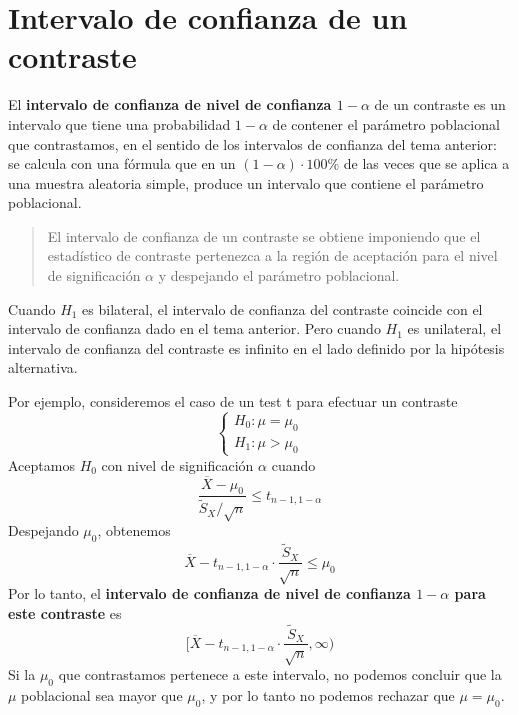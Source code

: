\documentclass[
  spanish,
  letterpaper,
  DIV=11,
  numbers=noendperiod]{scrreprt}
\begin{document}
\section{Intervalo de confianza de un
contraste}\label{intervalo-de-confianza-de-un-contraste}

El \textbf{intervalo de confianza de nivel de confianza \(1-\alpha\)} de
un contraste es un intervalo que tiene una probabilidad \(1-\alpha\) de
contener el parámetro poblacional que contrastamos, en el sentido de los
intervalos de confianza del tema anterior: se calcula con una fórmula
que en un \((1-\alpha)\cdot 100\%\) de las veces que se aplica a una
muestra aleatoria simple, produce un intervalo que contiene el parámetro
poblacional.

\begin{quote}
El intervalo de confianza de un contraste se obtiene imponiendo que el
estadístico de contraste pertenezca a la región de aceptación para el
nivel de significación \(\alpha\) y despejando el parámetro poblacional.
\end{quote}

\begin{tcolorbox}[enhanced jigsaw, arc=.35mm, bottomrule=.15mm, bottomtitle=1mm, breakable, colback=white, colbacktitle=quarto-callout-important-color!10!white, colframe=quarto-callout-important-color-frame, coltitle=black, left=2mm, leftrule=.75mm, opacityback=0, opacitybacktitle=0.6, rightrule=.15mm, title=\textcolor{quarto-callout-important-color}{\faExclamation}\hspace{0.5em}{Importante}, titlerule=0mm, toprule=.15mm, toptitle=1mm]

Cuando \(H_1\) es bilateral, el intervalo de confianza del contraste
coincide con el intervalo de confianza dado en el tema anterior. Pero
cuando \(H_1\) es unilateral, el intervalo de confianza del contraste es
infinito en el lado definido por la hipótesis alternativa.

\end{tcolorbox}

Por ejemplo, consideremos el caso de un test t para efectuar un
contraste \[
\left\{\begin{array}{l}
H_{0}:\mu=\mu_0\\ 
H_{1}:\mu > \mu_0
\end{array}
\right.
\] Aceptamos \(H_0\) con nivel de significación \(\alpha\) cuando \[
\dfrac{\overline{X}-\mu_0}{{\widetilde{S}_X}/{\sqrt{n}}}\leqslant t_{n-1,1-\alpha}
\] Despejando \(\mu_0\), obtenemos \[
\overline{X}- t_{n-1,1-\alpha}\cdot \dfrac{\widetilde{S}_X}{\sqrt{n}}\leqslant \mu_0
\] Por lo tanto, el \textbf{intervalo de confianza de nivel de confianza
\(1-\alpha\) para este contraste} es \[
\Bigg[\overline{X}- t_{n-1,1-\alpha}\cdot \dfrac{\widetilde{S}_X}{\sqrt{n}},\infty\Bigg)
\] Si la \(\mu_0\) que contrastamos pertenece a este intervalo, no
podemos concluir que la \(\mu\) poblacional sea mayor que \(\mu_0\), y
por lo tanto no podemos rechazar que \(\mu=\mu_0\).
\end{document}
